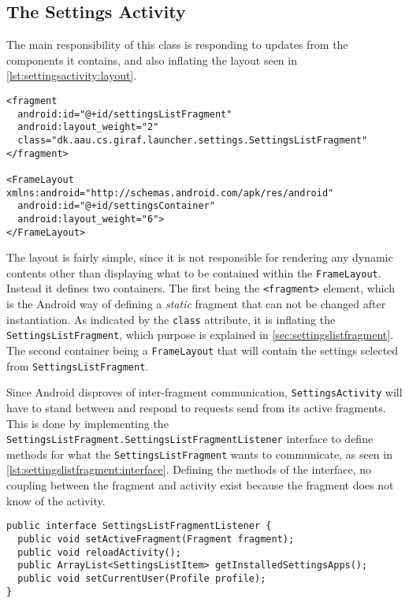 \subsection{The Settings Activity}\label{sec:sprint3:settings}

The main responsibility of this class is responding to updates from the components it contains, and also inflating the layout seen in \cref{lst:settingsactivity:layout}.

\begin{lstlisting}[caption={Excerpt of the layout defined for \lstinline|SettingsActivity|.}, label={lst:settingsactivity:layout}]
<fragment
  android:id="@+id/settingsListFragment"
  android:layout_weight="2"
  class="dk.aau.cs.giraf.launcher.settings.SettingsListFragment"
</fragment>

<FrameLayout xmlns:android="http://schemas.android.com/apk/res/android"
  android:id="@+id/settingsContainer"
  android:layout_weight="6">
</FrameLayout>
\end{lstlisting}

The layout is fairly simple, since it is not responsible for rendering any dynamic contents other than displaying what to be contained within the \lstinline|FrameLayout|.
Instead it defines two containers.
The first being the \lstinline|<fragment>| element, which is the Android way of defining a \textit{static} fragment that can not be changed after instantiation.
As indicated by the \lstinline|class| attribute, it is inflating the \lstinline|SettingsListFragment|, which purpose is explained in \cref{sec:settingslistfragment}.
The second container being a \lstinline|FrameLayout| that will contain the settings selected from \lstinline|SettingsListFragment|.

Since Android disproves of inter-fragment communication, \lstinline|SettingsActivity| will have to stand between and respond to requests send from its active fragments.
This is done by implementing the \lstinline|SettingsListFragment.SettingsListFragmentListener| interface to define methods for what the \lstinline|SettingsListFragment| wants to communicate, as seen in \cref{lst:settingslistfragment:interface}.
Defining the methods of the interface, no coupling between the fragment and activity exist because the fragment does not know of the activity.

\begin{lstlisting}[caption={The interface implemented in \lstinline|SettingsActivity| defined in \lstinline|SettingsListFragment|.}, label={lst:settingslistfragment:interface}]
public interface SettingsListFragmentListener {
  public void setActiveFragment(Fragment fragment);
  public void reloadActivity();
  public ArrayList<SettingsListItem> getInstalledSettingsApps();
  public void setCurrentUser(Profile profile);
}
\end{lstlisting}
